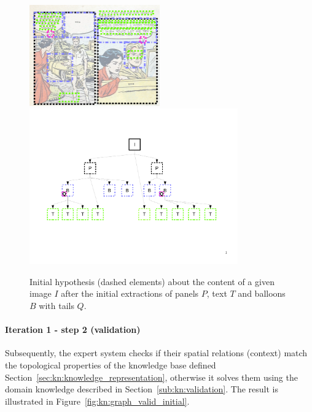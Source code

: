  \begin{figure}[!ht]  %
   \centering
   \includegraphics[trim= 0px 0px 0px 0px, clip, width=0.5\textwidth]{process_illustration_hypo_1.png}\\
  \includegraphics[trim= 30px 168px 20px 110px, clip, width=0.8\textwidth]{graph_init_1.pdf}
  \caption[Initial hypothesis about the content of a given image]{Initial hypothesis (dashed elements) about the content of a given image $I$ after the initial extractions of panels $P$, text $T$ and balloons $B$ with tails $Q$.
  }
  \label{fig:kn:graph0}
 \end{figure}

\paragraph{Iteration 1 - step 2 (validation)} %
\label{par:step_2}
Subsequently, the expert system checks if their spatial relations (context) match the topological properties of the knowledge base defined Section~\ref{sec:kn:knowledge_representation}, otherwise it solves them using the domain knowledge described in Section~\ref{sub:kn:validation}.
The result is illustrated in Figure~\ref{fig:kn:graph_valid_initial}.



